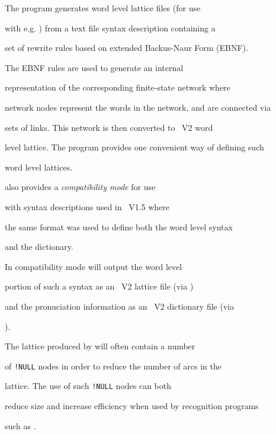 The  program generates word level lattice files (for use


with e.g. ) from a text file syntax description containing a 


set of rewrite rules based on extended Backus-Naur Form (EBNF). 


The EBNF rules are used to generate an internal


representation of the corresponding finite-state network where 


network nodes represent the words in the network, and are connected via


sets of links. This  network is then converted to \HTK\ V2 word


level lattice. The program provides one convenient way of defining such


word level lattices. 





 also provides a {\em compatibility mode} for use


with  syntax descriptions used in \HTK\ V1.5 where


the same format was used to define both the word level syntax 


and the dictionary.


In compatibility mode  will output the word level


portion of such a syntax as an \HTK\ V2 lattice file (via )


and the pronuciation information as an \HTK\ V2 dictionary file (via 


).





The lattice produced by  will often contain a number


of \texttt{!NULL} nodes in order to reduce the number of arcs in the


lattice. The use of such \texttt{!NULL} nodes can both


reduce size and  increase efficiency when used by recognition programs 


such as .










